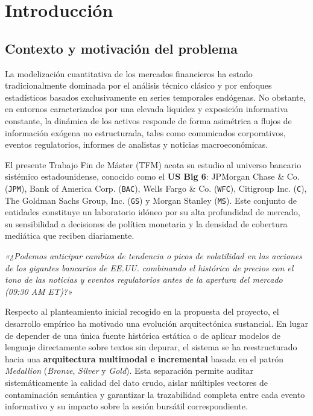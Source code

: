 \chapter{Introducción}

\section{Contexto y motivación del problema}
La modelización cuantitativa de los mercados financieros ha estado tradicionalmente dominada por el análisis técnico clásico y por enfoques estadísticos basados exclusivamente en series temporales endógenas. No obstante, en entornos caracterizados por una elevada liquidez y exposición informativa constante, la dinámica de los activos responde de forma asimétrica a flujos de información exógena no estructurada, tales como comunicados corporativos, eventos regulatorios, informes de analistas y noticias macroeconómicas.

El presente Trabajo Fin de Máster (TFM) acota su estudio al universo bancario sistémico estadounidense, conocido como el \textbf{US Big 6}: JPMorgan Chase \& Co. (\texttt{JPM}), Bank of America Corp. (\texttt{BAC}), Wells Fargo \& Co. (\texttt{WFC}), Citigroup Inc. (\texttt{C}), The Goldman Sachs Group, Inc. (\texttt{GS}) y Morgan Stanley (\texttt{MS}). Este conjunto de entidades constituye un laboratorio idóneo por su alta profundidad de mercado, su sensibilidad a decisiones de política monetaria y la densidad de cobertura mediática que reciben diariamente.

\begin{cajadestacada}
\textit{«¿Podemos anticipar cambios de tendencia o picos de volatilidad en las acciones de los gigantes bancarios de EE.UU. combinando el histórico de precios con el tono de las noticias y eventos regulatorios antes de la apertura del mercado (09:30 AM ET)?»}
\end{cajadestacada}

Respecto al planteamiento inicial recogido en la propuesta del proyecto, el desarrollo empírico ha motivado una evolución arquitectónica sustancial. En lugar de depender de una única fuente histórica estática o de aplicar modelos de lenguaje directamente sobre textos sin depurar, el sistema se ha reestructurado hacia una \textbf{arquitectura multimodal e incremental} basada en el patrón \textit{Medallion} (\textit{Bronze}, \textit{Silver} y \textit{Gold}). Esta separación permite auditar sistemáticamente la calidad del dato crudo, aislar múltiples vectores de contaminación semántica y garantizar la trazabilidad completa entre cada evento informativo y su impacto sobre la sesión bursátil correspondiente.

